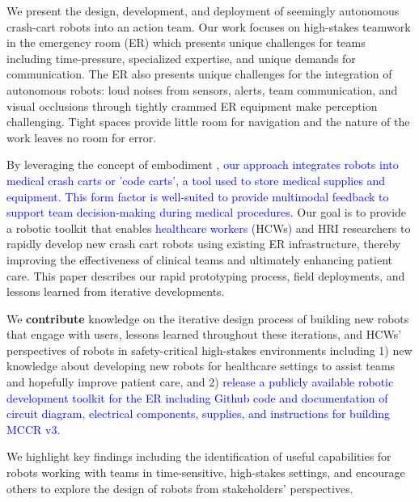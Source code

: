 We present the design, development, and deployment of seemingly autonomous crash-cart robots into an action team. 
Our work focuses on high-stakes teamwork in the emergency room (ER) which presents unique challenges for teams including time-pressure, specialized expertise, and unique demands for communication. 
The ER also presents unique challenges for the integration of autonomous robots: loud noises from sensors, alerts, team communication, and visual occlusions through tightly crammed ER equipment make perception challenging. 
Tight spaces provide little room for navigation and the nature of the work leaves no room for error.

By leveraging the concept of embodiment \cite{massaro1990psychology}, \textcolor{blue}{our approach integrates robots into medical crash carts or 'code carts', a tool used to store medical supplies and equipment. This form factor is well-suited to provide multimodal feedback to support team decision-making during medical procedures.} %
Our goal is to provide a robotic toolkit that enables \textcolor{blue}{healthcare workers (}HCWs\textcolor{blue}{)} and HRI researchers to rapidly develop new crash cart robots using existing ER infrastructure, thereby improving the effectiveness of clinical teams and ultimately enhancing patient care. 
This paper describes our rapid prototyping process, field deployments, and lessons learned from iterative developments. 

We \textbf{contribute} knowledge on the iterative design process of building new robots that engage with users, lessons learned throughout these iterations, and HCWs' perspectives of robots in safety-critical high-stakes environments including 1) new knowledge about developing new robots for healthcare settings to assist teams and hopefully improve patient care, and
2) \textcolor{blue}{release a publicly available robotic development toolkit for the ER including Github code and documentation of circuit diagram, electrical components, supplies, and instructions for building MCCR v3.} %

We highlight key findings %
including the identification of useful capabilities for robots working with teams in time-sensitive, high-stakes settings, and encourage others to explore the design of robots from stakeholders' perspectives.%


